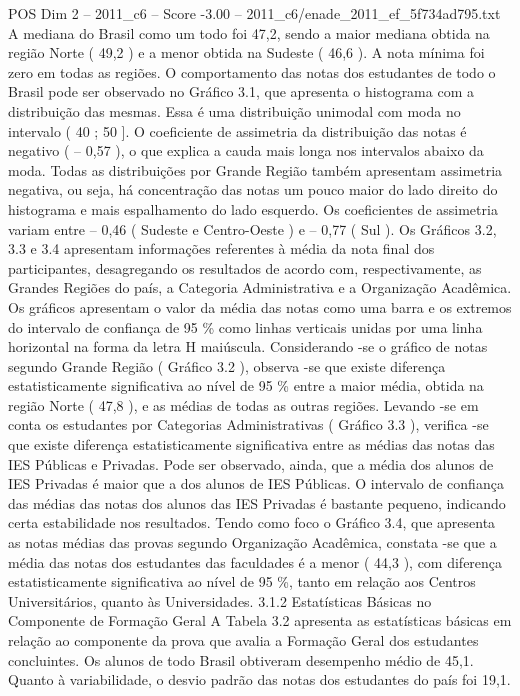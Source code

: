 \begin{textsample}{POS Dim 2 – 2011\_c6 – Score -3.00 – 2011\_c6/enade\_2011\_ef\_5f734ad795.txt}
A mediana do Brasil como um todo foi 47,2, sendo a maior mediana obtida na região Norte ( 49,2 ) e a menor obtida na Sudeste ( 46,6 ).
A nota mínima foi zero em todas as regiões.
O comportamento das notas dos estudantes de todo o Brasil pode ser observado no Gráfico 3.1, que apresenta o histograma com a distribuição das mesmas.
Essa é uma distribuição unimodal com moda no intervalo ( 40 ; 50 ].
O coeficiente de assimetria da distribuição das notas é negativo ( – 0,57 ), o que explica a cauda mais longa nos intervalos abaixo da moda.
Todas as distribuições por Grande Região também apresentam assimetria negativa, ou seja, há concentração das notas um pouco maior do lado direito do histograma e mais espalhamento do lado esquerdo.
Os coeficientes de assimetria variam entre – 0,46 ( Sudeste e Centro-Oeste ) e – 0,77 ( Sul ).
Os Gráficos 3.2, 3.3 e 3.4 apresentam informações referentes à média da nota final dos participantes, desagregando os resultados de acordo com, respectivamente, as Grandes Regiões do país, a Categoria Administrativa e a Organização Acadêmica.
Os gráficos apresentam o valor da média das notas como uma barra e os extremos do intervalo de confiança de 95 \% como linhas verticais unidas por uma linha horizontal na forma da letra H maiúscula.
Considerando -se o gráfico de notas segundo Grande Região ( Gráfico 3.2 ), observa -se que existe diferença estatisticamente significativa ao nível de 95 \% entre a maior média, obtida na região Norte ( 47,8 ), e as médias de todas as outras regiões.
Levando -se em conta os estudantes por Categorias Administrativas ( Gráfico 3.3 ), verifica -se que existe diferença estatisticamente significativa entre as médias das notas das IES Públicas e Privadas.
Pode ser observado, ainda, que a média dos alunos de IES Privadas é maior que a dos alunos de IES Públicas.
O intervalo de confiança das médias das notas dos alunos das IES Privadas é bastante pequeno, indicando certa estabilidade nos resultados.
Tendo como foco o Gráfico 3.4, que apresenta as notas médias das provas segundo Organização Acadêmica, constata -se que a média das notas dos estudantes das faculdades é a menor ( 44,3 ), com diferença estatisticamente significativa ao nível de 95 \%, tanto em relação aos Centros Universitários, quanto às Universidades. 3.1.2 Estatísticas Básicas no Componente de Formação Geral A Tabela 3.2 apresenta as estatísticas básicas em relação ao componente da prova que avalia a Formação Geral dos estudantes concluintes.
Os alunos de todo Brasil obtiveram desempenho médio de 45,1.
Quanto à variabilidade, o desvio padrão das notas dos estudantes do país foi 19,1.

\end{textsample}
